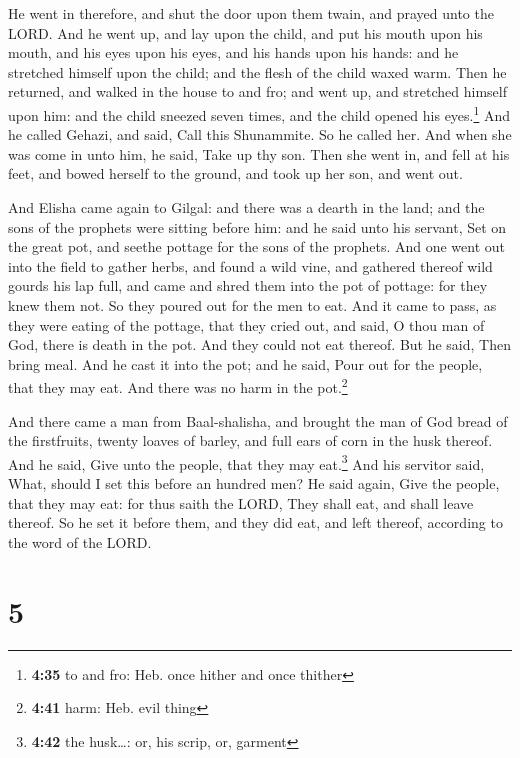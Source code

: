  He went in therefore, and shut the door upon them twain,
and prayed unto the LORD.  And he went up, and lay upon
the child, and put his mouth upon his mouth, and his eyes upon his eyes,
and his hands upon his hands: and he stretched himself upon the child;
and the flesh of the child waxed warm.  Then he returned,
and walked in the house to and fro; and went up, and stretched himself
upon him: and the child sneezed seven times, and the child opened his
eyes.\footnote{\textbf{4:35} to and fro: Heb. once hither and once
  thither}  And he called Gehazi, and said, Call this
Shunammite. So he called her. And when she was come in unto him, he
said, Take up thy son.  Then she went in, and fell at his
feet, and bowed herself to the ground, and took up her son, and went
out.

 And Elisha came again to Gilgal: and there was a dearth
in the land; and the sons of the prophets were sitting before him: and
he said unto his servant, Set on the great pot, and seethe pottage for
the sons of the prophets.  And one went out into the
field to gather herbs, and found a wild vine, and gathered thereof wild
gourds his lap full, and came and shred them into the pot of pottage:
for they knew them not.  So they poured out for the men
to eat. And it came to pass, as they were eating of the pottage, that
they cried out, and said, O thou man of God, there is death in the pot.
And they could not eat thereof.  But he said, Then bring
meal. And he cast it into the pot; and he said, Pour out for the people,
that they may eat. And there was no harm in the pot.\footnote{\textbf{4:41}
  harm: Heb. evil thing}

 And there came a man from Baal-shalisha, and brought the
man of God bread of the firstfruits, twenty loaves of barley, and full
ears of corn in the husk thereof. And he said, Give unto the people,
that they may eat.\footnote{\textbf{4:42} the husk\ldots: or, his scrip,
  or, garment}  And his servitor said, What, should I set
this before an hundred men? He said again, Give the people, that they
may eat: for thus saith the LORD, They shall eat, and shall leave
thereof.  So he set it before them, and they did eat, and
left thereof, according to the word of the LORD.

\hypertarget{section-4}{%
\section{5}\label{section-4}}

